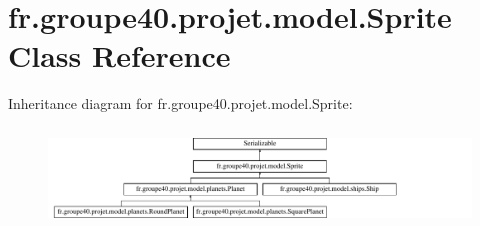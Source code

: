 \hypertarget{classfr_1_1groupe40_1_1projet_1_1model_1_1_sprite}{}\section{fr.\+groupe40.\+projet.\+model.\+Sprite Class Reference}
\label{classfr_1_1groupe40_1_1projet_1_1model_1_1_sprite}
Inheritance diagram for fr.\+groupe40.\+projet.\+model.\+Sprite\+:\begin{figure}[H]
\begin{center}
\leavevmode
\includegraphics[height=2.638398cm]{classfr_1_1groupe40_1_1projet_1_1model_1_1_sprite}
\end{center}
\end{figure}
